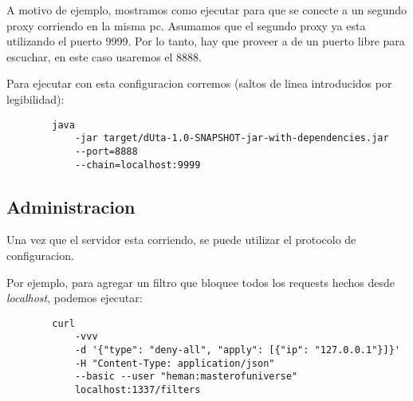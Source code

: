 \documentclass[11pt,a4paper,titlepage]{article}
\begin{document}
    A motivo de ejemplo, mostramos como ejecutar \duta para que se conecte a un segundo proxy corriendo en la misma pc.
    Asumamos que el segundo proxy ya esta utilizando el puerto 9999.
    Por lo tanto, hay que proveer a \duta de un puerto libre para escuchar, en este caso usaremos el 8888.

    Para ejecutar con esta configuracion corremos (saltos de linea introducidos por legibilidad):
    \begin{verbatim}
        java
            -jar target/dUta-1.0-SNAPSHOT-jar-with-dependencies.jar
            --port=8888
            --chain=localhost:9999
    \end{verbatim}

    \subsection{Administracion}
    Una vez que el servidor esta corriendo, se puede utilizar el protocolo de configuracion.

    Por ejemplo, para agregar un filtro que bloquee todos los requests hechos desde \textit{localhost}, podemos ejecutar:
    \begin{verbatim}
        curl
            -vvv
            -d '{"type": "deny-all", "apply": [{"ip": "127.0.0.1"}]}'
            -H "Content-Type: application/json"
            --basic --user "heman:masterofuniverse"
            localhost:1337/filters
    \end{verbatim}


\end{document}
